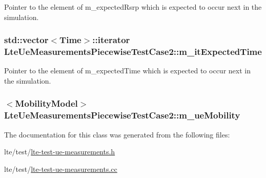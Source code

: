 Pointer to the element of {\ttfamily m\+\_\+expected\+Rsrp} which is expected to occur next in the simulation. 

\subsubsection[{\texorpdfstring{m\+\_\+it\+Expected\+Time}{m_itExpectedTime}}]{\setlength{\rightskip}{0pt plus 5cm}std\+::vector$<${\bf Time}$>$\+::iterator Lte\+Ue\+Measurements\+Piecewise\+Test\+Case2\+::m\+\_\+it\+Expected\+Time\hspace{0.3cm}{\ttfamily [private]}}\hypertarget{classLteUeMeasurementsPiecewiseTestCase2_a49b9123d994ebabacb649491774d231d}{}\label{classLteUeMeasurementsPiecewiseTestCase2_a49b9123d994ebabacb649491774d231d}


Pointer to the element of {\ttfamily m\+\_\+expected\+Time} which is expected to occur next in the simulation. 

\subsubsection[{\texorpdfstring{m\+\_\+ue\+Mobility}{m_ueMobility}}]{$<${\bf Mobility\+Model}$>$ Lte\+Ue\+Measurements\+Piecewise\+Test\+Case2\+::m\+\_\+ue\+Mobility\hspace{0.3cm}{\ttfamily [private]}}\hypertarget{classLteUeMeasurementsPiecewiseTestCase2_a085c911b012df1a52dde2bb903ba56e3}{}\label{classLteUeMeasurementsPiecewiseTestCase2_a085c911b012df1a52dde2bb903ba56e3}


The documentation for this class was generated from the following files\+:\begin{DoxyCompactItemize}
\item 
lte/test/\hyperlink{lte-test-ue-measurements_8h}{lte-\/test-\/ue-\/measurements.\+h}\item 
lte/test/\hyperlink{lte-test-ue-measurements_8cc}{lte-\/test-\/ue-\/measurements.\+cc}\end{DoxyCompactItemize}
